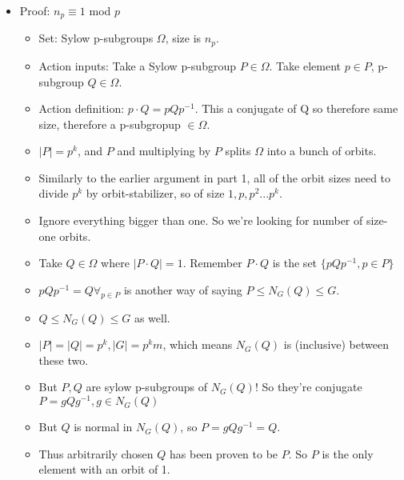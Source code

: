\documentclass[11pt, oneside]{article}   	%
\begin{document}
\begin{itemize}
\item Proof: $n_p \equiv 1$ mod $p$
\begin{itemize}
\item Set: Sylow p-subgroups $\Omega$, size is $n_p$.
\item Action inputs: Take a Sylow p-subgroup $P \in \Omega$.  Take element $p \in P$, p-subgroup $Q \in \Omega$.  
\item Action definition: $p \cdot Q = pQp^{-1}$.  This a conjugate of Q so therefore same size, therefore a p-subgropup $\in \Omega$.
\item $|P| = p^k$, and $P$  and multiplying by $P$ splits $\Omega$ into a bunch of orbits.
\item Similarly to the earlier argument in part 1, all of the orbit sizes need to divide $p^k$ by orbit-stabilizer, so of size $1, p, p^2... p^k$.  
\item Ignore everything bigger than one.  So we're looking for number of size-one orbits.
\item Take $Q \in \Omega$ where $|P \cdot Q| = 1$.  Remember $ P \cdot Q$ is the set $\{pQp^{-1}, p \in P\}$
\item $pQp^{-1} = Q \forall_{p \in P}$ is another way of saying $P \leq N_G(Q) \leq G$.
\item $Q \leq N_G(Q) \leq G$ as well.  
\item $|P| = |Q| = p^k, |G| = p^km$, which means $N_G(Q)$ is (inclusive) between these two.
\item But $P, Q$ are sylow p-subgroups of $N_G(Q)$!  So they're conjugate $P = gQg^{-1}, g \in N_G(Q)$
\item But $Q$ is normal in $N_G(Q)$, so $P = gQg^{-1} = Q$.  
\item Thus arbitrarily chosen $Q$ has been proven to be $P$.  So $P$ is the only element with an orbit of 1.
\end{itemize}
\end{itemize}
\end{document}
